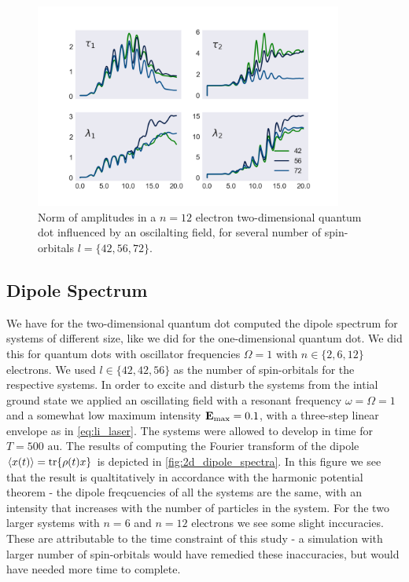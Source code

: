 \begin{figure}
    \centering
    \includegraphics[width=0.9\textwidth]{results/figures/2D/n=12_amplitudes.png}
    \caption{Norm of amplitudes in a $n=12$ electron two-dimensional quantum 
        dot influenced by an oscilalting field, for several number of 
        spin-orbitals $l=\{42,56,72\}$.
    }
    \label{fig:n12_2d_amp_norms}
\end{figure}

\subsection{Dipole Spectrum}

We have for the two-dimensional quantum dot computed the dipole spectrum for systems of 
different size, like we did for the one-dimensional quantum dot. We did this for 
quantum dots with oscillator frequencies $\Omega=1$ with $n\in\{2,6,12\}$ electrons.
We used $l\in\{42,42,56\}$ as the number of spin-orbitals for the respective systems.
In order to excite and disturb the systems from the intial ground state we applied 
an oscillating field with a resonant frequency $\omega=\Omega=1$ and a somewhat low 
maximum intensity $\vb{E}_\text{max}=0.1$, with a three-step linear envelope as 
in \autoref{eq:li_laser}. The systems were allowed to develop in time for 
$T = 500 \text{ au}$. The results of computing the Fourier transform of the 
dipole $\ev{x(t)} = \tr{\rho(t) x}$ is depicted in \autoref{fig:2d_dipole_spectra}. 
In this figure we see that the result is qualtitatively in accordance with the 
harmonic potential theorem - the dipole freqcuencies of all the systems are the 
same, with an intensity that increases with the number of particles in the system.
For the two larger systems with $n=6$ and $n=12$ electrons we see some slight 
inccuracies. These are attributable to the time constraint of this study - 
a simulation with larger number of spin-orbitals would have remedied these 
inaccuracies, but would have needed more time to complete.


